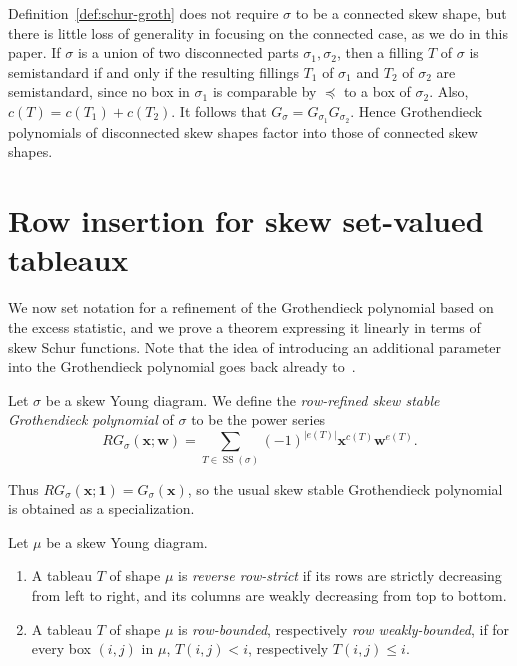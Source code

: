 \documentclass[ALCO,ThmDefs,Unicode,epreuves]{cedram}
\DeclareMathOperator{\Semi}{SS}
\begin{document}
\begin{rema} \label{rem:disconn}
Definition~\ref{def:schur-groth} does not require $\sigma$ to be a connected skew shape, but there is little loss of generality in focusing on the connected case, as we do in this paper. If $\sigma$ is a union of two disconnected parts $\sigma_1, \sigma_2$, then a filling $T$ of $\sigma$ is semistandard if and only if the resulting fillings $T_1$ of $\sigma_1$ and $T_2$ of $\sigma_2$ are semistandard, since no box in $\sigma_1$ is comparable by $\preceq$ to a box of $\sigma_2$. Also, $c(T) = c(T_1) + c(T_2)$. It follows that $G_\sigma = G_{\sigma_1} G_{\sigma_2}$. Hence Grothendieck polynomials of disconnected skew shapes factor into those of connected skew shapes.
\end{rema}

\section{Row insertion for skew set-valued tableaux}

We now set notation for a refinement of the Grothendieck polynomial based on the excess statistic, and we prove a theorem expressing it linearly in terms of skew Schur functions. Note that the idea of introducing an additional parameter into the Grothendieck polynomial goes back already to~\cite{fomin-kirillov-grothendieck}.

\begin{defi} \label{def:rg} Let $\sigma$ be a skew Young diagram.
We define the \emph{row-refined skew stable Grothendieck polynomial} of $\sigma$ to be the power series 
\[
RG_\sigma(\mathbf{x};\mathbf{w}) = \sum_{T\in \Semi(\sigma)} (-1)^{|e(T)|} \mathbf{x}^{c(T)} \mathbf{w}^{e(T)}.
\]
\end{defi}
\noindent Thus $RG_\sigma(\mathbf{x};\mathbf{1}) = G_\sigma(\mathbf{x})$, so the usual skew stable Grothendieck polynomial is obtained as a specialization.


\begin{defi}Let $\mu$ be a skew Young diagram.
\begin{enumerate}
\item\label{defi3.2_1} A tableau $T$ of shape $\mu$ is \emph{reverse row-strict} if its rows are strictly decreasing from left to right, and its columns are weakly decreasing from top to bottom. 
\item\label{defi3.2_2} A tableau $T$ of shape $\mu$ is \emph{row-bounded}, respectively \emph{row weakly-bounded}, if for every box $(i,j)$ in $\mu$, $T(i,j) < i$, respectively $T(i,j)\le i$.
\end{enumerate}
\end{defi}
\end{document}
